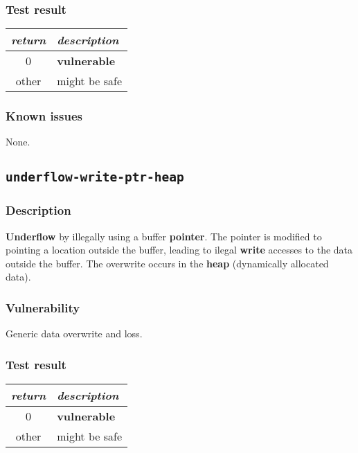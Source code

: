 \documentclass[a4paper]{book}
\begin{document}
\subsubsection{Test result}

\begin{tabular}{cl}
  \toprule
  \emph{return}  & \emph{description} \\
  \midrule
  0              & \textbf{vulnerable} \\
  other          & might be safe \\
  \bottomrule
\end{tabular}

\subsubsection{Known issues}

None.

\newpage


\subsection{\texttt{underflow-write-ptr-heap}}\label{test-underflow-write-ptr-heap}

\subsubsection{Description}

\textbf{Underflow} by illegally using a buffer \textbf{pointer}.
The pointer is modified to pointing a location outside the buffer,
leading to ilegal \textbf{write} accesses to the data outside the buffer.
The overwrite occurs in the \textbf{heap} (dynamically allocated data).

\subsubsection{Vulnerability}
Generic data overwrite and loss.

\subsubsection{Test result}

\begin{tabular}{cl}
  \toprule
  \emph{return}  & \emph{description} \\
  \midrule
  0              & \textbf{vulnerable} \\
  other          & might be safe \\
  \bottomrule
\end{tabular}
\end{document}
